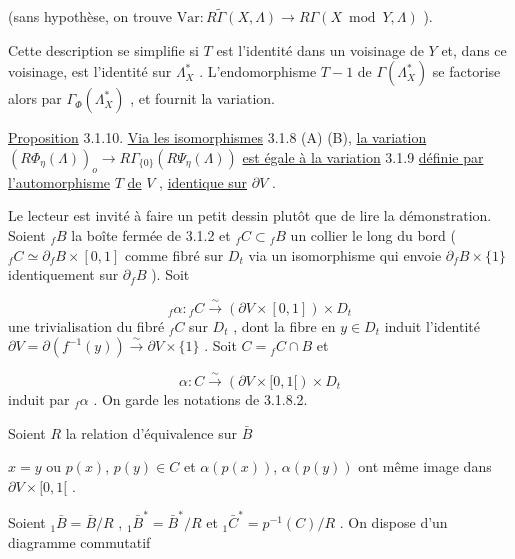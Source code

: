 
 (sans hypothèse, on trouve $\mathrm{Var} : R\widetilde{\Gamma} (X, \Lambda) \longrightarrow R\Gamma (X \bmod Y, \Lambda)$ ).

Cette description se simplifie si $T$ est l'identité dans un voisinage de $Y$ et, dans ce voisinage, est l'identité sur $\Lambda^*_X$ . L'endomorphisme $T-1$ de $\Gamma (\Lambda^*_X)$ se factorise alors par $\Gamma_\Phi(\Lambda^*_X)$ , et fournit la variation.

\underline{Proposition} 3.1.10. \underline{Via les isomorphismes} 3.1.8 (A) (B), \underline{la variation} $(R\Phi_\eta(\Lambda))_o \to R\Gamma_{\{0\}}(R\Psi_\eta(\Lambda))$ \underline{est égale à la variation} 3.1.9 \underline{définie par l'automorphisme} $T$ \underline{de} $V$ , \underline{identique sur} $\partial V$ .

Le lecteur est invité à faire un petit dessin plutôt que de lire la démonstration. Soient ${}_fB$ la boîte fermée de 3.1.2 et ${}_fC \subset {}_fB$ un collier le long du bord ( ${}_fC \simeq \partial_fB \times [0, 1]$ comme fibré sur $D_t$ via un isomorphisme qui envoie $\partial_fB \times \{1\}$ identiquement sur $\partial_fB$ ). Soit

\begin{equation*}
{}_f\alpha : {}_fC \overset{\sim}{\longrightarrow} (\partial V \times [0,1]) \times D_t
\end{equation*}
une trivialisation du fibré ${}_fC$ sur $D_t$ , dont la fibre en $y \in D_t$ induit l'identité $\partial V = \partial(f^{-1}(y)) \overset{\sim}{\longrightarrow} \partial V \times \{1\}$ . Soit $C = {}_fC \cap B$ et

\begin{equation*}
\alpha : C \overset{\sim}{\longrightarrow} (\partial V \times [0,1[) \times D_t
\end{equation*}
induit par ${}_f\alpha$ . On garde les notations de 3.1.8.2.

Soient $R$ la relation d'équivalence sur $\bar{B}$

$x = y$ ou $p(x)$, $p(y) \in C$ et $\alpha(p(x))$, $\alpha(p(y))$ ont même image dans $\partial V \times [0,1[$ .

Soient ${}_1\bar{B} = \bar{B}/R$ , ${}_1\bar{B}^* = \bar{B}^*/R$ et ${}_1\bar{C}^* = p^{-1}(C)/R$ . On dispose d'un diagramme commutatif 



